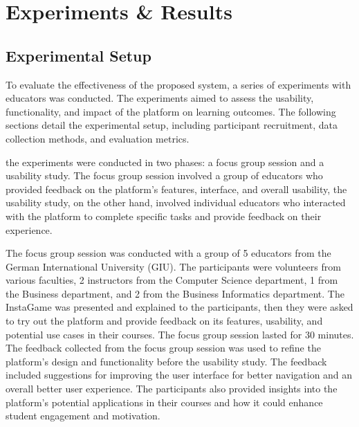 \chapter{Experiments \& Results}\label{chap:results}

\section{Experimental Setup}
To evaluate the effectiveness of the proposed system, a series of experiments with educators was conducted. The experiments aimed to assess the usability, functionality, and impact of the platform on learning outcomes. The following sections detail the experimental setup, including participant recruitment, data collection methods, and evaluation metrics.

the experiments were conducted in two phases: a focus group session and a usability study. The focus group session involved a group of educators who provided feedback on the platform's features, interface, and overall usability, the usability study, on the other hand, involved individual educators who interacted with the platform to complete specific tasks and provide feedback on their experience.

The focus group session was conducted with a group of 5 educators from the German International University (GIU). The participants were volunteers from various faculties, 2 instructors from the Computer Science department, 1 from the Business department, and 2 from the Business Informatics department. The InstaGame was presented and explained to the participants, then they were asked to try out the platform and provide feedback on its features, usability, and potential use cases in their courses. The focus group session lasted for 30 minutes. The feedback collected from the focus group session was used to refine the platform's design and functionality before the usability study. The feedback included suggestions for improving the user interface for better navigation and an overall better user experience. The participants also provided insights into the platform's potential applications in their courses and how it could enhance student engagement and motivation.

